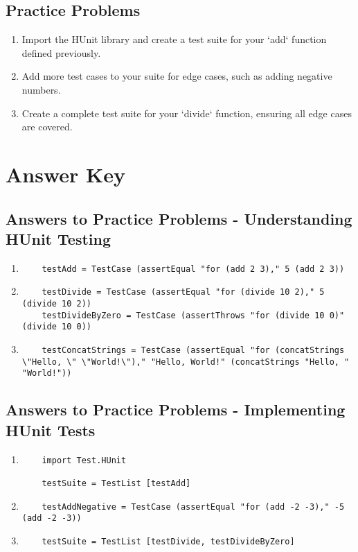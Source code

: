 \documentclass{article}
\begin{document}
\subsection*{Practice Problems}
\begin{enumerate}
    \item Import the HUnit library and create a test suite for your `add` function defined previously.
    \item Add more test cases to your suite for edge cases, such as adding negative numbers.
    \item Create a complete test suite for your `divide` function, ensuring all edge cases are covered.
\end{enumerate}

\section*{Answer Key}
\subsection*{Answers to Practice Problems - Understanding HUnit Testing}
\begin{enumerate}
    \item 
    \begin{verbatim}
    testAdd = TestCase (assertEqual "for (add 2 3)," 5 (add 2 3))
    \end{verbatim}
    \item 
    \begin{verbatim}
    testDivide = TestCase (assertEqual "for (divide 10 2)," 5 (divide 10 2))
    testDivideByZero = TestCase (assertThrows "for (divide 10 0)" (divide 10 0))
    \end{verbatim}
    \item 
    \begin{verbatim}
    testConcatStrings = TestCase (assertEqual "for (concatStrings \"Hello, \" \"World!\")," "Hello, World!" (concatStrings "Hello, " "World!"))
    \end{verbatim}
\end{enumerate}

\subsection*{Answers to Practice Problems - Implementing HUnit Tests}
\begin{enumerate}
    \item 
    \begin{verbatim}
    import Test.HUnit

    testSuite = TestList [testAdd]
    \end{verbatim}
    \item 
    \begin{verbatim}
    testAddNegative = TestCase (assertEqual "for (add -2 -3)," -5 (add -2 -3))
    \end{verbatim}
    \item 
    \begin{verbatim}
    testSuite = TestList [testDivide, testDivideByZero]
    \end{verbatim}
\end{enumerate}
\end{document}
